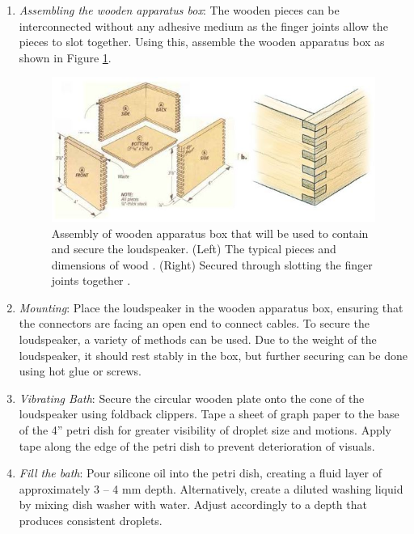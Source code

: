 \begin{enumerate}

\item \textit{Assembling the wooden apparatus box}: The wooden pieces can be interconnected without any adhesive medium as the finger joints allow the pieces to slot together. Using this, assemble the wooden apparatus box as shown in Figure \ref{fig:WoodenBox}.

\begin{figure}[h]
    \centering
    \includegraphics[width=\textwidth]{prototype/WoodenBox.jpg}
    \caption{Assembly of wooden apparatus box that will be used to contain and secure the loudspeaker. (Left) The typical pieces and dimensions of wood \cite{boxdimensions}. (Right)  Secured through slotting the finger joints together \cite{fingerjoints}.}
    \label{fig:WoodenBox}
\end{figure}

\item  \textit{Mounting}: Place the loudspeaker in the wooden apparatus box, ensuring that the connectors are facing an open end to connect cables. To secure the loudspeaker, a variety of methods can be used. Due to the weight of the loudspeaker, it should rest stably in the box, but further securing can be done using hot glue or screws.

\item  \textit{Vibrating Bath}: Secure the circular wooden plate onto the cone of the loudspeaker using foldback clippers. Tape a sheet of graph paper to the base of the 4” petri dish for greater visibility of droplet size and motions. Apply tape along the edge of the petri dish to prevent deterioration of visuals.

\item  \textit{Fill the bath}: Pour silicone oil into the petri dish, creating a fluid layer of approximately 3 – 4 mm depth. Alternatively, create a diluted washing liquid by mixing dish washer with water. Adjust accordingly to a depth that produces consistent droplets.


\end{enumerate}
